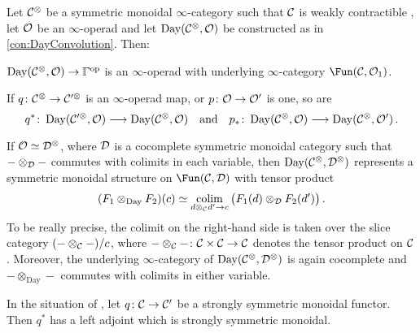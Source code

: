 \begin{prop}\label{prop:DayConvolution}
	Let $\mathcal{C}^\otimes$ be a symmetric monoidal $\infty$-category such that $\mathcal{C}$ is weakly contractible , let $\mathcal{O}$ be an $\infty$-operad and let $\operatorname{Day}(\mathcal{C}^\otimes,\mathcal{O})$ be constructed as in \cref{con:DayConvolution}. Then:
	\begin{alphanumerate}
		\item $\operatorname{Day}(\Cc^\otimes,\Oo)\morphism \IGamma^\op$ is an $\infty$-operad with underlying $\infty$-category $\Fun(\Cc,\Oo_1)$.
		\item If $q\colon \Cc^\otimes\morphism \Cc'^\otimes$ is an $\infty$-operad map, or $p\colon \Oo\morphism\Oo'$ is one, so are
		\begin{equation*}
			q^*\colon \operatorname{Day}(\Cc'^\otimes,\Oo)\morphism\operatorname{Day}(\Cc^\otimes,\Oo)\quad\text{and}\quad p_*\colon \operatorname{Day}(\Cc^\otimes,\Oo)\morphism \operatorname{Day}(\Cc^\otimes,\Oo')\,.
		\end{equation*}
		\item If $\mathcal{O}\simeq \mathcal{D}^\otimes$, where $\mathcal{D}$ is a cocomplete symmetric monoidal category such that $-\otimes_{\mathcal{D}} -$ commutes with colimits in each variable, then $\operatorname{Day}(\mathcal{C}^\otimes,\mathcal{D}^\otimes)$ represents a symmetric monoidal structure on $\Fun(\Cc,\Dd)$ with tensor product
		\begin{equation*}
			(F_1\otimes_{\operatorname{Day}} F_2)(c)\simeq \colimit_{d\otimes_\Cc d'\morphism c} \big(F_1(d)\otimes_\Dd F_2(d')\big)\,.
		\end{equation*}
		To be really precise, the colimit on the right-hand side is taken over the slice category $(-\otimes_{\mathcal{C}} -)/c$, where $-\otimes_\Cc-\colon \Cc\times\Cc\morphism\Cc$ denotes the tensor product on $\mathcal{C}$. Moreover, the underlying $\infty$-category of $\operatorname{Day}(\mathcal{C}^\otimes,\mathcal{D}^\otimes)$ is again cocomplete and $-\otimes_{\operatorname{Day}}-$ commutes with colimits in either variable.
		
		\item In the situation of , let $q\colon \Cc\morphism \Cc'$ be a strongly symmetric monoidal functor. Then $q^*$ has a left adjoint  which is strongly symmetric monoidal.
	\end{alphanumerate}
\end{prop}
